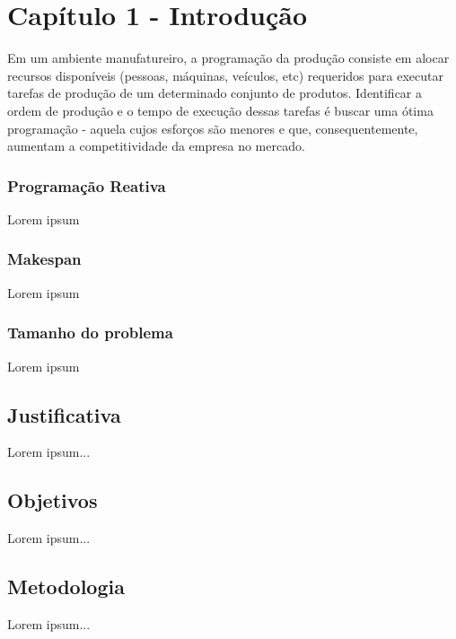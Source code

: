
\newpage
\section{Capítulo 1 - Introdução}
Em um ambiente manufatureiro, a programação da produção consiste em alocar recursos disponíveis (pessoas, máquinas, veículos, etc) requeridos para executar tarefas de produção de um determinado conjunto de produtos. Identificar a ordem de produção e o tempo de execução dessas tarefas é buscar uma ótima programação - aquela cujos esforços são menores e que, consequentemente, aumentam a competitividade da empresa no mercado.

\subsubsection{Programação Reativa}
Lorem ipsum

    \subsubsection{Makespan}
    Lorem ipsum
        
    \subsubsection{Tamanho do problema}
    Lorem ipsum

\subsection{Justificativa}
Lorem ipsum...

\subsection{Objetivos}
Lorem ipsum...

\subsection{Metodologia}
Lorem ipsum...